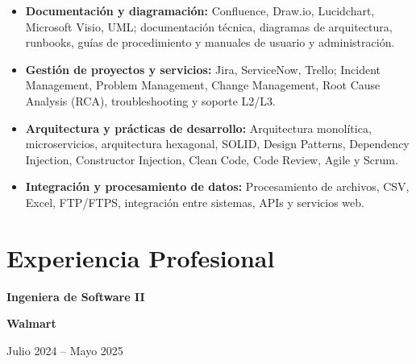 \documentclass[10pt,letterpaper]{article}
\newcommand{\jobtitle}[1]{
    {\bfseries #1}
}
\newcommand{\company}[1]{
    {\bfseries\color{DarkGray} #1}
}
\newcommand{\jobdate}[1]{
    {\color{MediumGray} #1}
}
\begin{document}
\begin{itemize}
    \item \textbf{Documentación y diagramación:}
    Confluence, Draw.io, Lucidchart, Microsoft Visio, UML;
    documentación técnica, diagramas de arquitectura, runbooks,
    guías de procedimiento y manuales de usuario y administración.

    \item \textbf{Gestión de proyectos y servicios:}
    Jira, ServiceNow, Trello;
    Incident Management, Problem Management, Change Management,
    Root Cause Analysis (RCA), troubleshooting y soporte L2/L3.

    \item \textbf{Arquitectura y prácticas de desarrollo:}
    Arquitectura monolítica, microservicios, arquitectura hexagonal,
    SOLID, Design Patterns, Dependency Injection, Constructor Injection,
    Clean Code, Code Review, Agile y Scrum.

    \item \textbf{Integración y procesamiento de datos:}
    Procesamiento de archivos, CSV, Excel, FTP/FTPS,
    integración entre sistemas, APIs y servicios web.

\end{itemize}


\section{Experiencia Profesional}



\jobtitle{Ingeniera de Software II} \textbar{}
\company{Walmart}
\hfill \textbar{}
\jobdate{Julio 2024 -- Mayo 2025}
\end{document}
